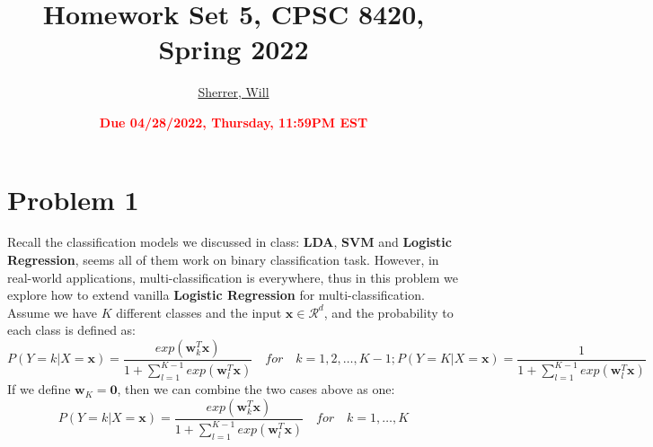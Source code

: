 \documentclass[11pt]{article}
\title{{\bf Homework Set 5, CPSC 8420, Spring 2022}} %
\author{\Large\underline{Sherrer, Will}}
\date{\textbf{\Large\textcolor{red}{Due 04/28/2022, Thursday, 11:59PM EST}}} %
\newcommand{\vct}[1]{\mathbf{#1}}
\def \vzero    {\vct{0}}
\def \vw {\vct{w}}
\def \vx {\vct{x}}
\begin{document}
\maketitle
\section*{Problem 1}
Recall the classification models we discussed in class: \textbf{LDA}, \textbf{SVM} and \textbf{Logistic Regression}, seems all of them work on binary classification task. However, in real-world applications, multi-classification is everywhere, thus in this problem we explore how to extend vanilla \textbf{Logistic Regression} for multi-classification. Assume we have $K$ different classes and the input $
\vx\in\mathcal{R}^d$, and the probability to each class is defined as:
\begin{equation}
		P(Y=k|X=\vx) =  \frac{exp(\vw_k^T\vx)}{ 1+\sum_{l=1}^{K-1}exp(\vw_l^T\vx)} \quad for  \quad k=1,2,\dots,K-1; P(Y=K|X=\vx) =  \frac{1} { 1+\sum_{l=1}^{K-1}exp(\vw_l^T\vx)}
\end{equation}
If we define $\vw_K=\vzero$, then we can combine the two cases above as one:
\begin{equation}
	P(Y=k|X=\vx) =  \frac{exp(\vw_k^T\vx)}{ 1+\sum_{l=1}^{K-1}exp(\vw_l^T\vx)} \quad for  \quad k=1,\dots,K
\end{equation}
\end{document}
